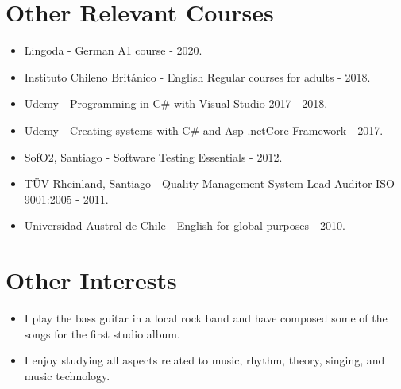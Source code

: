 \documentclass[a4paper,10pt]{article}
\begin{document}
\section*{Other Relevant Courses}
\begin{itemize}[leftmargin=*,itemsep=0pt]
  \item Lingoda - German A1 course - 2020.
  \item Instituto Chileno Británico - English Regular courses for adults - 2018.
  \item Udemy - Programming in C# with Visual Studio 2017 - 2018.
  \item Udemy - Creating systems with C# and Asp .netCore Framework - 2017.
  \item SofO2, Santiago - Software Testing Essentials - 2012.
  \item TÜV Rheinland, Santiago - Quality Management System Lead Auditor ISO 9001:2005 - 2011.
  \item Universidad Austral de Chile - English for global purposes - 2010.
\end{itemize}

\section*{Other Interests}
\begin{itemize}[leftmargin=*,itemsep=0pt]
  \item I play the bass guitar in a local rock band and have composed some of the songs for the first studio album.
  \item I enjoy studying all aspects related to music, rhythm, theory, singing, and music technology.
\end{itemize}
\end{document}

